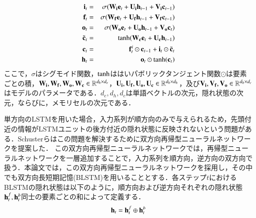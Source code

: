 \documentclass[dvipdfmx,twocolumn,10.5pt]{jsarticle}
\begin{document}
\begin{eqnarray}
{\bf i}_t&=&\sigma ({\bf W}_{\bf i} {\bf e}_t + {\bf U}_{\bf i}{\bf h}_{t-1} + {\bf V}_{\bf i}{\bf c}_{t-1}) \\
{\bf f}_t&=&\sigma ({\bf W}_{\bf f} {\bf e}_t + {\bf U}_{\bf f}{\bf h}_{t-1} + {\bf V}_{\bf f}{\bf c}_{t-1}) \\
{\bf o}_t&=& \sigma ({\bf W}_{\bf o} {\bf e}_t + {\bf U}_{\bf o}{\bf h}_{t-1} + {\bf V}_{\bf o}{\bf c}_{t}) \\
\tilde{{\bf c}}_t &=& {\rm tanh}({\bf W}_{\bf c} {\bf e}_t + {\bf U}_{\bf c}{\bf h}_{t-1}) \\
{\bf c}_t &=& {\bf f}_t^i \odot {\bf c}_{t-1} + {\bf i}_t \odot \tilde{{\bf c}}_t \\
{\bf h}_t &=& {\bf o}_t \odot {\rm tanh}({\bf c}_t) 
\end{eqnarray}
ここで，$\sigma$はシグモイド関数，${\rm tanh}$ははいパボリックタンジェント関数$\odot$は要素ごとの積，${\bf W}_{\bf i}, {\bf W}_{\bf f}, {\bf W}_{\bf o}, {\bf W}_{\bf c} \in \mathbb{R}^{d_h\times d_e} $，${\bf U}_{\bf i}, {\bf U}_{\bf f}, {\bf U}_{\bf o}, {\bf U}_{\bf c} \in \mathbb{R}^{d_h\times d_h} $，及び${\bf V}_{\bf i}, {\bf V}_{\bf f}, {\bf V}_{\bf o} \in \mathbb{R}^{d_h\times d_c} $ はモデルのパラメータである．$d_e, d_h, d_c$は単語ベクトルの次元，隠れ状態の次元，ならびに，メモリセルの次元である．

単方向のLSTMを用いた場合，入力系列が順方向のみで与えられるため，先頭付近の情報がLSTMユニットの後方付近の隠れ状態に反映されないという問題がある．Schusterらはこの問題を解決するために双方向再帰型ニューラルネットワークを提案した．\cite{schuster1997bidirectional}
この双方向再帰型ニューラルネットワークでは，再帰型ニューラルネットワークを一層追加することで，入力系列を順方向，逆方向の双方向で扱う．本論文では，この双方向再帰型ニューラルネットワークを採用し，その中でも双方向長短期記憶(BLSTM)を用いることとする．各ステップ$t$におけるBLSTMの隠れ状態は以下のように，順方向および逆方向それぞれの隠れ状態${\bf h}_t^f, {\bf h}_t^b$同士の要素ごとの和によって定義する．
\begin{equation}
  {\bf h}_t = {\bf h}_t^f \oplus  {\bf h}_t^b
\end{equation}
\end{document}
